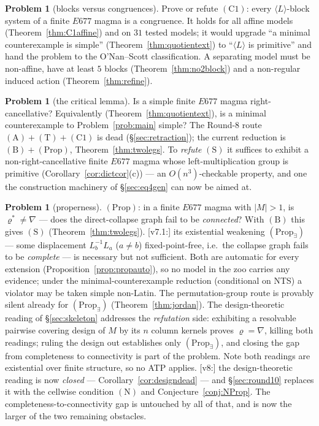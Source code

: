 \documentclass[11pt]{article}
\theoremstyle{plain}
\theoremstyle{definition}
\newtheorem{problem}[theorem]{Problem}
\theoremstyle{remark}
\numberwithin{equation}{section}
\begin{document}
\begin{problem}[blocks versus congruences]\label{prob:C1}
Prove or refute $(\mathrm{C1})$: every $\langle L\rangle$-block system of a finite $E677$
magma is a congruence. It holds for all affine models (Theorem~\ref{thm:C1affine}) and on
$31$ tested models; it would upgrade ``a minimal counterexample is simple''
(Theorem~\ref{thm:quotientext}) to ``$\langle L\rangle$ is primitive'' and hand the problem
to the O'Nan--Scott classification. A separating model must be non-affine, have at least $5$
blocks (Theorem~\ref{thm:no2block}) and a non-regular induced action
(Theorem~\ref{thm:refine}).
\end{problem}

\begin{problem}[the critical lemma]\label{prob:S}
Is a simple finite $E677$ magma right-cancellative? Equivalently
(Theorem~\ref{thm:quotientext}), is a minimal counterexample to
Problem~\ref{prob:main} simple? The Round-8 route
$(\mathrm{A})+(\mathrm{T})+(\mathrm{C1})$ is dead (\S\ref{sec:retraction}); the
current reduction is $(\mathrm{B})+(\mathrm{Prop})$, Theorem~\ref{thm:twolegs}. To
\emph{refute} $(\mathrm{S})$ it suffices to exhibit a non-right-cancellative finite
$E677$ magma whose left-multiplication group is primitive
(Corollary~\ref{cor:dictcor}(c)) --- an $O(n^3)$-checkable property, and one the
construction machinery of \S\ref{sec:eq4gen} can now be aimed at.
\end{problem}

\begin{problem}[properness]\label{prob:Prop}
$(\mathrm{Prop})$: in a finite $E677$ magma with $|M|>1$, is
$\varrho^{*}\ne\nabla$ --- does the direct-collapse graph fail to be
\emph{connected}? With $(\mathrm{B})$ this gives $(\mathrm{S})$
(Theorem~\ref{thm:twolegs}). [v7.1:] its existential weakening
$(\mathrm{Prop}_{\exists})$ --- some displacement $L_b^{-1}L_a$ ($a\ne b$)
fixed-point-free, i.e.\ the collapse graph fails to be \emph{complete} --- is
necessary but not sufficient. Both are automatic for every extension
(Proposition~\ref{prop:propauto}), so no model in the zoo carries any evidence;
under the minimal-counterexample reduction (conditional on NTS) a violator may be
taken simple non-Latin. The permutation-group route is provably silent already
for $(\mathrm{Prop}_{\exists})$ (Theorem~\ref{thm:jordan}). The design-theoretic
reading of \S\ref{sec:skeleton} addresses the \emph{refutation} side: exhibiting
a resolvable pairwise covering design of $M$ by its $n$ column kernels proves
$\varrho=\nabla$, killing both readings; ruling the design out establishes only
$(\mathrm{Prop}_{\exists})$, and closing the gap from completeness to
connectivity is part of the problem. Note both readings are existential over
finite structure, so no ATP applies. [v8:] the design-theoretic reading is now
\emph{closed} --- Corollary~\ref{cor:designdead} --- and \S\ref{sec:round10}
replaces it with the cellwise condition $(\mathrm{N})$ and
Conjecture~\ref{conj:NProp}. The completeness-to-connectivity gap is untouched by
all of that, and is now the larger of the two remaining obstacles.
\end{problem}
\end{document}
